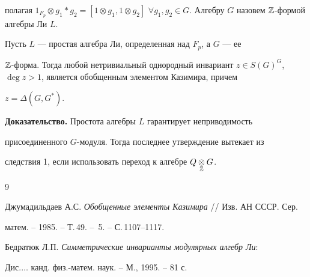 полагая $1_{F_p}\otimes g_1 * g_2=[1\otimes g_1,1\otimes g_2]$ $\forall 


g_1,g_2\in G$. Алгебру $G$ назовем $\Bbb Z$-формой алгебры Ли $L$. 


 


\begin{cor} 


Пусть $L$ --- простая алгебра Ли, определенная над $F_p$, а $G$ --- ее 


$\Bbb Z$-форма. Тогда любой нетривиальный однородный инвариант $z\in 


S(G)^G$, $\deg z>1$, является обобщенным элементом Казимира, причем 


$z=\Delta(G,G^*)$. 


\end{cor} 


 


{\bf Доказательство.} Простота алгебры $L$ гарантирует неприводимость 


присоединенного $G$-модуля. Тогда последнее утверждение вытекает из 


следствия 1, если использовать переход к алгебре $Q\underset{\Bbb 


Z}{\otimes}{}G$. 


 


 


\begin{thebibliography}{9} 


 




Джумадильдаев А.С. {\em Обобщенные элементы Казимира} // Изв. АН СССР. Сер. 


матем. -- 1985. -- Т.\,49. -- \No\,5. -- С.\,1107--1117. 




Бедратюк Л.П. {\em Симметрические инварианты модулярных алгебр Ли}: 


Дис.\;$\dotsc$ канд. физ.-матем. наук. -- М., 1995. -- 81 с. 


 


 


\end{thebibliography} 


 


\vskip 2cm 


 






 


\label{end} 


 


